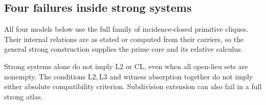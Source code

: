 \subsection{Four failures inside strong systems}
All four models below use the full family of incidence-closed
primitive cliques. Their internal relations are as stated or
computed from their carriers, so the general strong construction
supplies the prime core and its relative calculus.

\begin{counterexample}
\label{ex:four-strong}
Strong systems alone do not imply $\mathrm L2$ or $\mathrm{CL}$,
even when all open-lieu sets are nonempty. The conditions
$\mathrm L2,\mathrm L3$ and witness absorption together do not
imply either absolute compatibility criterion. Subdivision
extension can also fail in a full strong atlas.
\end{counterexample}
